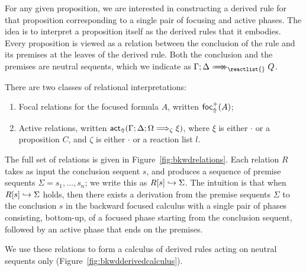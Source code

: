 For any given proposition, we are interested in constructing a derived rule for
that proposition corresponding to a single pair of focusing and active
phases. The idea is to interpret a proposition itself as the derived rules that
it embodies. Every proposition is viewed as a relation between the conclusion of
the rule and its premises at the leaves of the derived rule. Both the conclusion
and the premises are neutral sequents, which we indicate as
$\zbneuseq{\Gamma}{\Delta}{\reactlist{}}{Q}$.

There are two classes of relational interpretations:

\begin{enumerate}
\item Focal relations for the focused formula $A$, written $\textsf{foc}^+_{\Uparrow}(A)$;
\item Active relations, written
  $\textsf{act}_{\Uparrow}(\Gamma; \Delta; \Omega \Longrightarrow_{\zeta} \xi)$, where $\xi$ is
  either $\cdot$ or a proposition $C$, and $\zeta$ is either $\cdot$ or a
  reaction list $l$.
\end{enumerate}

The full set of relations is given in Figure~\ref{fig:bkwdrelations}. Each
relation $R$ takes as input the conclusion sequent $s$, and produces a sequence
of premise sequents $\Sigma = s_1, \dots, s_n$; we write this as
$R [s] \hookrightarrow \Sigma$. The intuition is that when $R [s] \hookrightarrow \Sigma$ holds,
then there exists a derivation from the premise sequents $\Sigma$ to the
conclusion $s$ in the backward focused calculus with a single pair of phases
consisting, bottom-up, of a focused phase starting from the conclusion sequent,
followed by an active phase that ends on the premises.

We use these relations to form a calculus of derived
rules acting on neutral sequents only (Figure~\ref{fig:bkwdderivedcalculus}).

